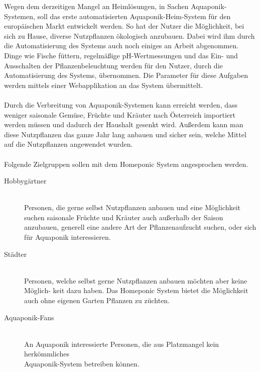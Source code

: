 Wegen dem derzeitigen Mangel an Heimlösungen, in Sachen Aquaponik-Systemen, soll das erste automatisierten Aquaponik-Heim-System für den europäischen Markt entwickelt werden. So hat der Nutzer die Möglichkeit, bei sich zu Hause, diverse Nutzpflanzen ökologisch anzubauen. Dabei wird ihm durch die Automatisierung des Systems auch noch einiges an Arbeit abgenommen. Dinge wie Fische füttern, regelmäßige pH-Wertmessungen und das Ein- und Ausschalten der Pflanzenbeleuchtung werden für den Nutzer, durch die Automatisierung des Systems, übernommen. Die Parameter für diese Aufgaben werden mittels einer Webapplikation an das System übermittelt.\\ \mbox{} \\
Durch die Verbreitung von Aquaponik-Systemen kann erreicht werden, dass weniger saisonale Gemüse, Früchte und Kräuter nach Österreich importiert werden müssen und dadurch der  Haushalt gesenkt wird. Außerdem kann man diese Nutzpflanzen das ganze Jahr lang anbauen und sicher sein, welche Mittel auf die Nutzpflanzen angewendet wurden.\\ \mbox{} \\ 
Folgende Zielgruppen sollen mit dem Homeponic System angesprochen werden.
\begin{description}
	\item[Hobbygärtner]\mbox{} \\
Personen, die gerne selbst Nutzpflanzen anbauen und eine Möglichkeit suchen saisonale Früchte und Kräuter auch außerhalb der Saison anzubauen, generell eine andere Art der Pflanzenaufzucht suchen, oder sich für Aquaponik interessieren.
	\item[Städter]\mbox{} \\
Personen, welche selbst gerne Nutzpflanzen anbauen möchten aber keine Möglich- keit dazu haben. Das Homeponic System bietet die Möglichkeit auch ohne eigenen Garten Pflanzen zu züchten.
	\item[Aquaponik-Fans]\mbox{} \\
An Aquaponik interessierte Personen, die aus Platzmangel kein herkömmliches\\ Aquaponik-System betreiben können.
\end{description}
